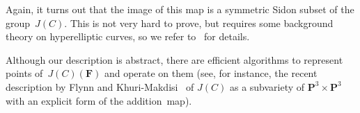 \documentclass[12pt]{amsart}
\numberwithin{equation}{section}
\newcommand{\Ff}{\mathbf{F}}
\theoremstyle{plain}
\theoremstyle{remark}
\theoremstyle{definition}
\begin{document}
Again, it turns out that the image of this map is a symmetric Sidon
subset of the group~$J(C)$. This is not very hard to prove, but
requires some background theory on hyperelliptic curves, so we refer
to~\cite{ffk2} for details.

Although our description is abstract, there are
efficient algorithms to represent points of~$J(C)(\Ff)$ and 
operate on them (see, for instance, the recent description by Flynn and
Khuri-Makdisi~\cite{f-km} of $J(C)$ as a subvariety of
$\mathbf{P}^3\times \mathbf{P}^3$ with an explicit form of the
addition~map).



\end{document}
